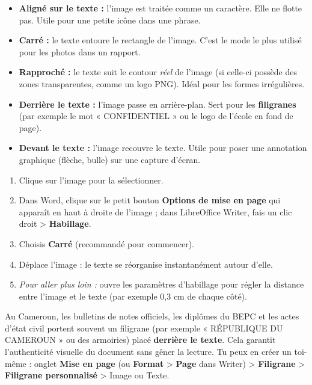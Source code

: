 \documentclass[11pt]{article}
\begin{document}
\begin{propriete}
\begin{itemize}
    \item \textbf{Aligné sur le texte :} l'image est traitée comme un caractère. Elle ne flotte pas. Utile pour une petite icône dans une phrase.
    \item \textbf{Carré :} le texte entoure le rectangle de l'image. C'est le mode le plus utilisé pour les photos dans un rapport.
    \item \textbf{Rapproché :} le texte suit le contour \emph{réel} de l'image (si celle-ci possède des zones transparentes, comme un logo PNG). Idéal pour les formes irrégulières.
    \item \textbf{Derrière le texte :} l'image passe en arrière-plan. Sert pour les \textbf{filigranes} (par exemple le mot « CONFIDENTIEL » ou le logo de l'école en fond de page).
    \item \textbf{Devant le texte :} l'image recouvre le texte. Utile pour poser une annotation graphique (flèche, bulle) sur une capture d'écran.
\end{itemize}
\end{propriete}

\begin{methode}
\begin{enumerate}
    \item Clique sur l'image pour la sélectionner.
    \item Dans Word, clique sur le petit bouton \textbf{Options de mise en page} qui apparaît en haut à droite de l'image ; dans LibreOffice Writer, fais un clic droit \textgreater{} \textbf{Habillage}.
    \item Choisis \textbf{Carré} (recommandé pour commencer).
    \item Déplace l'image : le texte se réorganise instantanément autour d'elle.
    \item \emph{Pour aller plus loin :} ouvre les paramètres d'habillage pour régler la distance entre l'image et le texte (par exemple 0,3 cm de chaque côté).
\end{enumerate}
\end{methode}

\begin{savaistu}
Au Cameroun, les bulletins de notes officiels, les diplômes du BEPC et les actes d'état civil portent souvent un filigrane (par exemple « RÉPUBLIQUE DU CAMEROUN » ou des armoiries) placé \textbf{derrière le texte}. Cela garantit l'authenticité visuelle du document sans gêner la lecture. Tu peux en créer un toi-même : onglet \textbf{Mise en page} (ou \textbf{Format} \textgreater{} \textbf{Page} dans Writer) \textgreater{} \textbf{Filigrane} \textgreater{} \textbf{Filigrane personnalisé} \textgreater{} Image ou Texte.
\end{savaistu}
\end{document}
